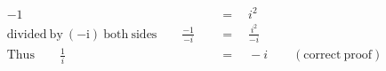\begin{align*}
-1\quad&\,=\quad i^2\\
\mathrm{divided~by~(-i)~both~sides}\qquad\frac{-1}{-i}\quad&\,=\quad\frac{i^2}{-i}\\
\mathrm{Thus}\qquad\frac{1}{i}\quad&\,=\quad-i\qquad\mathrm{(correct~proof)}
\end{align*}
